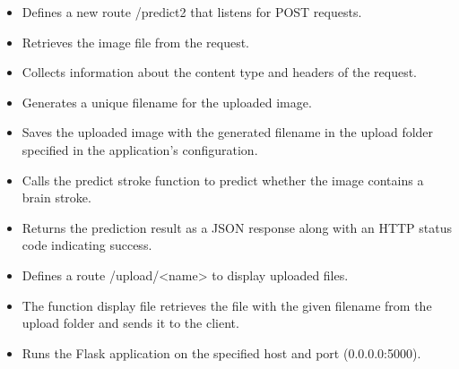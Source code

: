\begin{itemize}
    \item Defines a new route /predict2 that listens for POST requests.
    \item Retrieves the image file from the request.
    \item Collects information about the content type and headers of the request.
    \item Generates a unique filename for the uploaded image.
    \item Saves the uploaded image with the generated filename in the upload folder specified in the application's configuration.
    \item Calls the predict stroke function to predict whether the image contains a brain stroke.
    \item Returns the prediction result as a JSON response along with an HTTP status code indicating success.
    \item Defines a route /upload/<name> to display uploaded files.
    \item The function display file retrieves the file with the given filename from the upload folder and sends it to the client.
    \item Runs the Flask application on the specified host and port (0.0.0.0:5000).
\end{itemize}


